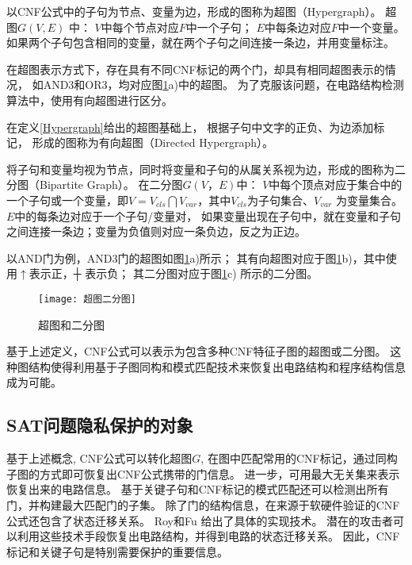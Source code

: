 \begin{definition}[超图]\label{Hypergraph}
 以CNF公式中的子句为节点、变量为边，形成的图称为超图（Hypergraph）。
 超图$G(V,E)$ 中：
 $V$中每个节点对应$F$中一个子句；
 $E$中每条边对应$F$中一个变量。
 如果两个子句包含相同的变量，就在两个子句之间连接一条边，并用变量标注。
\end{definition}

在超图表示方式下，存在具有不同CNF标记的两个门，却具有相同超图表示的情况，
如AND3和OR3，均对应图\ref{graph}a)中的超图。
为了克服该问题，在电路结构检测算法中，使用有向超图进行区分。

\begin{definition}[有向超图]
在定义\ref{Hypergraph}给出的超图基础上，
根据子句中文字的正负、为边添加标记，
形成的图称为有向超图（Directed Hypergraph）。
\end{definition}

\begin{definition}[二分图]
将子句和变量均视为节点，同时将变量和子句的从属关系视为边，形成的图称为二分图（Bipartite Graph）。
在二分图$G(V，E)$中：
$V$中每个顶点对应于集合中的一个子句或一个变量，即$V=V_{cls}\bigcap V_{var}$，其中$V_{cls}$为子句集合、$V_{var}$ 为变量集合。
$E$中的每条边对应于一个子句/变量对，
如果变量出现在子句中，就在变量和子句之间连接一条边；变量为负值则对应一条负边，反之为正边。
\end{definition}

以AND门为例，AND3门的超图如图\ref{graph}a)所示；
其有向超图对应于图\ref{graph}b)，其中使用$\uparrow$表示正，┼ 表示负；
其二分图对应于图\ref{graph}c) 所示的二分图。
\begin{figure}[t]
  \centering
  \texttt{[image: 超图二分图]}
  \caption{超图和二分图}
  \label{graph}
\end{figure}

基于上述定义，CNF公式可以表示为包含多种CNF特征子图的超图或二分图。
这种图结构使得利用基于子图同构和模式匹配技术来恢复出电路结构和程序结构信息成为可能。

\subsection{SAT问题隐私保护的对象}
基于上述概念,
CNF公式可以转化超图$G$,
在图中匹配常用的CNF标记，通过同构子图的方式即可恢复出CNF公式携带的门信息。
进一步，可用最大无关集来表示恢复出来的电路信息。
基于关键子句和CNF标记的模式匹配还可以检测出所有门，并构建最大匹配门的子集。
除了门的结构信息，在来源于软硬件验证的CNF公式还包含了状态迁移关系。
Roy和Fu 给出了具体的实现技术。
潜在的攻击者可以利用这些技术手段恢复出电路结构，并得到电路的状态迁移关系。
因此，CNF标记和关键子句是特别需要保护的重要信息。

